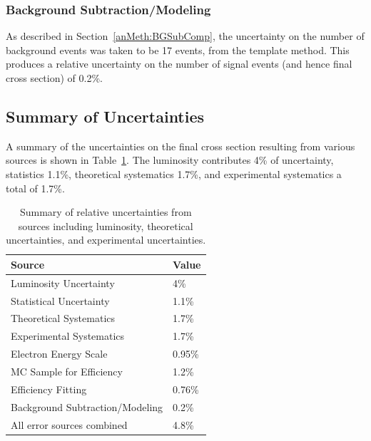 \subsubsection{Background Subtraction/Modeling}
\label{anMeth:SystsOtherBGSub}


As described in Section~\ref{anMeth:BGSubComp}, 
the uncertainty on the number of background 
events was taken to be 17 events, 
from the template method.  
This produces a relative uncertainty 
on the number of signal events 
(and hence final cross section) 
of 0.2\%.  

\subsection{Summary of Uncertainties}
\label{anMeth:SystsSummary}

A summary of the uncertainties on the final 
cross section resulting from various sources 
is shown in Table~\ref{TableSystsSummary}.  
The luminosity contributes 4\% of uncertainty, 
statistics 1.1\%, 
theoretical systematics 1.7\%, 
and experimental systematics a total of 1.7\%.  

\begin{table}[htbp]
  \begin{center}
    \caption[\fixspacing Summary of uncertainties]{
      \fixspacing Summary of relative uncertainties from sources 
      including luminosity, theoretical uncertainties, 
      and experimental uncertainties.  
    }
    \label{TableSystsSummary}
    \begin{tabular}[]{ | l | l | }
      \hline
      Source & Value  \\ \hline \hline
      Luminosity Uncertainty & 4\% \\ \hline 
      Statistical Uncertainty & 1.1\% \\ \hline 
      Theoretical Systematics & 1.7\% \\ \hline \hline 
      Experimental Systematics & 1.7\% \\ \hline \hline 
      Electron Energy Scale & 0.95\% \\ \hline 
      MC Sample for Efficiency & 1.2\% \\ \hline 
      Efficiency Fitting & 0.76\% \\ \hline 
      Background Subtraction/Modeling & 0.2\% \\ \hline \hline 
      All error sources combined & 4.8\% \\ \hline 
    \end{tabular}
  \end{center}
\end{table}


